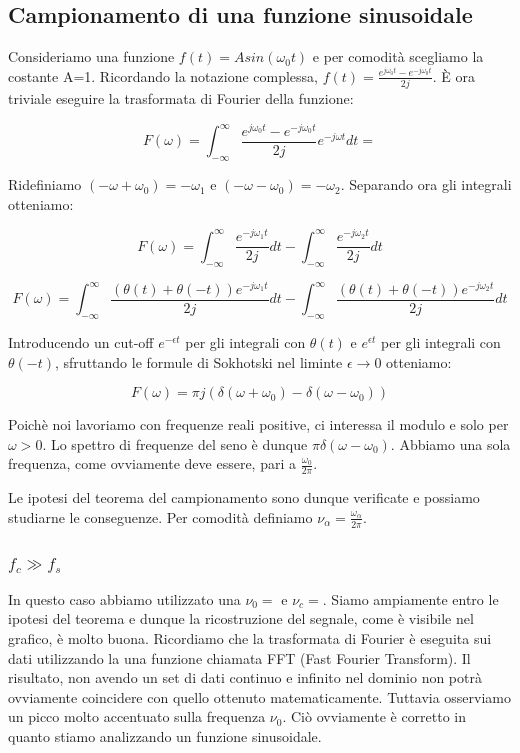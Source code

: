 \subsection{Campionamento di una funzione sinusoidale}

Consideriamo una funzione $f(t)=Asin(\omega_0 t)$ e per comodità scegliamo la costante A=1. Ricordando la notazione complessa, $f(t)=\frac{e^{j\omega_0 t}-e^{-j\omega_0 t}}{2j}$. È ora triviale eseguire la trasformata di Fourier della funzione:

$$F(\omega)=\int_{-\infty}^{\infty} \frac{e^{j\omega_0 t}-e^{-j\omega_0 t}}{2j}e^{-j\omega t} dt=$$

Ridefiniamo $(-\omega + \omega_0)=-\omega_1$ e $(-\omega - \omega_0)=-\omega_2$. Separando ora gli integrali otteniamo:

$$F(\omega)=\int_{-\infty}^{\infty} \frac{e^{-j\omega_1 t}}{2j}dt - \int_{-\infty}^{\infty} \frac{e^{-j\omega_2 t}}{2j}dt$$

$$F(\omega)=\int_{-\infty}^{\infty} \frac{(\theta(t)+\theta(-t)) e^{-j\omega_1 t}}{2j}dt - \int_{-\infty}^{\infty} \frac{(\theta(t)+\theta(-t))e^{-j\omega_2 t}}{2j}dt$$


Introducendo un cut-off $e^{-\epsilon t}$ per gli integrali con $\theta(t)$ e $e^{\epsilon t}$ per gli integrali con $\theta(-t)$, sfruttando le formule di Sokhotski nel liminte $\epsilon \rightarrow 0$ otteniamo:

$$F(\omega)=\pi j (\delta(\omega + \omega_0) - \delta(\omega - \omega_0))$$

Poichè noi lavoriamo con frequenze reali positive, ci interessa il modulo e solo per $\omega > 0$. Lo spettro di frequenze del seno è dunque $\pi \delta(\omega-\omega_0)$. Abbiamo una sola frequenza, come ovviamente deve essere, pari a $\frac{\omega_0}{2\pi}$. 

Le ipotesi del teorema del campionamento sono dunque verificate e possiamo studiarne le conseguenze. Per comodità definiamo $\nu_{\alpha}=\frac{\omega_{\alpha}}{2\pi}$.


\subsubsection{$f_c \gg f_s$}

In questo caso abbiamo utilizzato una $\nu_0=$ e $\nu_c=$. Siamo ampiamente entro le ipotesi del teorema e dunque la ricostruzione del segnale, come è visibile nel grafico, è molto buona. Ricordiamo che la trasformata di Fourier è eseguita sui dati utilizzando la una funzione chiamata FFT (Fast Fourier Transform). Il risultato, non avendo un set di dati continuo e infinito nel dominio non potrà ovviamente coincidere con quello ottenuto matematicamente. Tuttavia osserviamo un picco molto accentuato sulla frequenza $\nu_0$. Ciò ovviamente è corretto in quanto stiamo analizzando un funzione sinusoidale.

